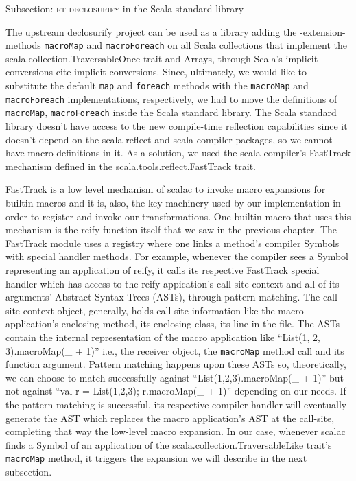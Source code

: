 Subsection: \textsc{ft-declosurify} in the Scala standard library

The upstream declosurify project can be used as a library adding the -extension-
methods \texttt{macroMap} and \texttt{macroForeach} on all Scala collections that implement the
scala.collection.TraversableOnce trait and Arrays, through Scala's implicit
conversions {cite implicit conversions}. Since, ultimately, we would like to
substitute the default \texttt{map} and \texttt{foreach} methods with the \texttt{macroMap} and
\texttt{macroForeach} implementations, respectively, we had to move the definitions
of \texttt{macroMap}, \texttt{macroForeach} inside the Scala standard library. The Scala standard
library doesn't have access to the new compile-time reflection capabilities
since it doesn't depend on the scala-reflect and scala-compiler packages, so we
cannot have macro definitions in it. As a solution, we used the scala compiler's
FastTrack mechanism defined in the scala.tools.reflect.FastTrack trait.

FastTrack is a low level mechanism of scalac to invoke macro
expansions for builtin macros and it is, also, the key machinery used by our
implementation in order to register and invoke our transformations. One builtin
macro that uses this mechanism is the reify function itself that we saw in the
previous chapter. The FastTrack module uses a registry where one links a
method's compiler Symbols with special handler methods. For example, whenever
the compiler sees a Symbol representing an application of reify, it calls its
respective FastTrack special handler which has access to the reify appication's
call-site context and all of  its arguments' Abstract Syntax Trees (ASTs),
through pattern matching. The call-site context object, generally, holds
call-site information like the macro application's enclosing method, its
enclosing class, its line in the file. The ASTs contain the internal
representation of the macro application like ``List(1, 2, 3).macroMap(\_ + 1)''
i.e., the receiver object, the \texttt{macroMap} method call and its function argument.
Pattern matching happens upon these ASTs so, theoretically, we can choose to
match successfully against ``List(1,2,3).macroMap(\_ + 1)'' but not against ``val
r = List(1,2,3); r.macroMap(\_ + 1)'' depending on our needs. If the pattern
matching is successful, its respective compiler handler will eventually generate
the AST which replaces the macro application's AST at the call-site, completing
that way the low-level macro expansion. In our case, whenever scalac finds a
Symbol of an application of the scala.collection.TraversableLike trait's
\texttt{macroMap} method, it triggers the expansion we will describe in the next
subsection.

